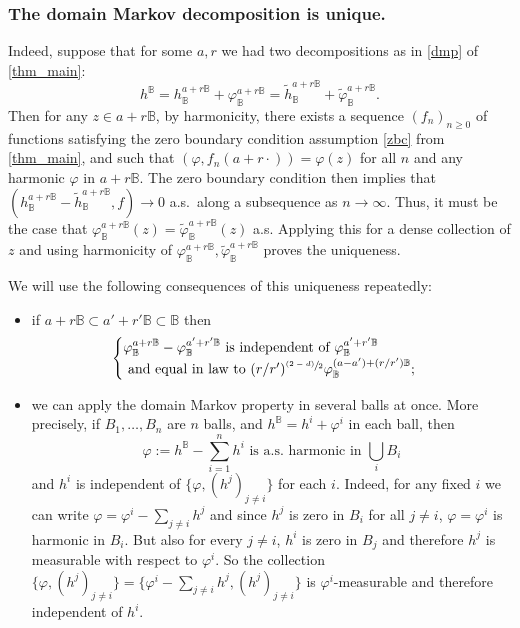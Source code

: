 \documentclass[JEP,XML,SOM,Unicode,published]{cedram}
\newcommand{\psfrac}[2]{\sfrac{(#1)}{#2}}
\theoremstyle{definition}
\newcommand{\B}{\mathbb{B}}\let\D\B\let\Ub\B
\begin{document}
\subsubsection*{The domain Markov decomposition is unique.} Indeed, suppose that for some $a,r$ we had two decompositions as in \eqref{dmp} of \cref{thm_main}:
\[
h^\B=h_\B^{a+r\B}+\varphi_\B^{a+r\B}=\tilde{h}_\B^{a+r\B}+\tilde{\varphi}_\B^{a+r\B}.
\]
Then for any $z\in a+r\B$, by harmonicity, there exists a sequence $(f_n)_{n\ge 0}$ of functions satisfying the zero boundary condition assumption \eqref{zbc} from \cref{thm_main}, and such that $(\varphi,f_n(a+r\cdot))=\varphi(z)$ for all $n$ and any harmonic $\varphi$ in $a+r\B$. The zero boundary condition then implies that $(h_\B^{a+r\B}-\tilde{h}_\B^{a+r\B},f)\to 0$ a.s.\ along a subsequence as $n\to \infty$. Thus, it must be the case that $\varphi_\B^{a+r\B}(z)=\tilde{\varphi}_\B^{a+r\B}(z)$ a.s. Applying this for a dense collection of $z$ and using harmonicity of $\varphi_\B^{a+r\B},\tilde{\varphi}_\B^{a+r\B}$ proves the uniqueness.

We will use the following consequences of this uniqueness repeatedly:
\begin{itemize}
\item if $a+r\B \subset a'+r'\B\subset \B$ then
\begin{equation}\label{eq:it_dmp}
\begin{cases}
\varphi_\B^{a+r\B}-\varphi_\B^{a'+r'\B} \text{ is independent of } \varphi_{\B}^{a'+r'\B}\\
\text{ and equal in law to } (r/r')^{\psfrac{2-d}{2}}\varphi_\B^{(a-a')+(r/r')\B};
\end{cases}
\end{equation}
\item
we can apply the domain Markov property in several balls at once. More precisely, if $B_1,\dots, B_n$ are $n$ balls, and $h^\B=h^i+\varphi^i$ in each ball, then
\begin{equation}
\label{eq:multidmp}
\varphi:=h^\B - \sum_{i=1}^n h^i \text{ is a.s.\ harmonic in } \bigcup_{i}B_i
\end{equation} and $h^i$ is independent of $\{\varphi,(h^j)_{j\ne i}\}$ for each $i$. Indeed, for any fixed $i$ we can write $\varphi=\varphi^i-\sum_{j\ne i}h^j$ and since $h^j$ is zero in $B_i$ for all $j\ne i$, $\varphi=\varphi^i$ is harmonic in $B_i$. But also for every $j\ne i$, $h^i$ is zero in $B_j$ and therefore $h^j$ is measurable with respect to $\varphi^i$. So the collection $\{\varphi,(h^j)_{j\ne i}\}=\{\varphi^i-\sum_{j\ne i} h^j,(h^j)_{j\ne i}\}$ is $\varphi^i$-measurable and therefore independent of $h^i$.
\end{itemize}
\end{document}
